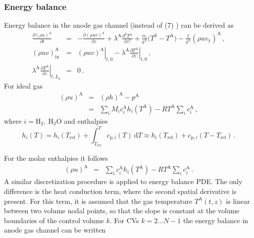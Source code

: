 \documentclass[pdftex,a4paper, 12pt]{article}
\begin{document}
\subsubsection*{Energy balance}
%
Energy balance in the anode gas channel (instead of (7) \cite{Mangold2010}) can be derived as
%
\begin{eqnarray}
	\frac{\partial (\rho u)^{\mathrm{A}}}{\partial t} &=&-\frac{\partial (\rho u v)^{\mathrm{A}}}{\partial z} + \lambda^{\mathrm{A}} 	\frac{\partial^2 T^{\mathrm{A}}}{\partial z^2} + \frac{\alpha_1}{\delta^{\mathrm{A}}} \big( T^{\mathrm{S}} - T^{\mathrm{A}} \big) - \frac{1}{\delta^{\mathrm{A}}} (\rho u v_{\mathrm{y}})^{\mathrm{A}} \, , \label{eq:energy_balA} \\
	(\rho u v)_{\mathrm{in}}^{\mathrm{A}} &=& \left.(\rho u v)^{\mathrm{A}} \right|_{t,0} - \left.\lambda^{\mathrm{A}} \frac{\partial T^{\mathrm{A}}}{\partial z} \right|_{t,0} \, , \label{eq:energy_balA_bc1} \\
	\left.\lambda^{\mathrm{A}} \frac{\partial T^{\mathrm{A}}}{\partial z} \right|_{t,L_{\mathrm{z}}} &=& 0 \, . \label{eq:energy_balA_bc2}
\end{eqnarray}
%
For ideal gas
\begin{eqnarray}
	(\rho u)^{\mathrm{A}} &=& (\rho h)^{\mathrm{A}} - p^{\mathrm{A}} \,\label{eq:rho_u_ideal_gas} \nonumber \\ 
	  &=& \sum_{i} M_{i} c_{i}^{\mathrm{A}} h_{i}(T^{\mathrm{A}}) - R T^{\mathrm{A}} \sum_{i} c_{i}^{\mathrm{A}} \, ,
\end{eqnarray}
%
where $i = \mathrm{H_2}, ~\mathrm{H_2O}$ and enthalpies
%
\begin{equation}
	h_{i}(T) = h_{i}(T_{\mathrm{ref}}) + \int_{T_{\mathrm{ref}}}^{T} c_{\mathrm{p,i}}(T) ~\mathrm{d}T \approx h_{i}(T_{\mathrm{ref}}) + c_{\mathrm{p},i} (T - T_{\mathrm{ref}}) \, .
	\label{eq:enthalpy_gasA}
\end{equation}
%
%
\par
%
For the molar enthalpies it follows
%
\begin{eqnarray}
	(\rho u)^{\mathrm{A}} &=& \sum_{i} c_{i}^{\mathrm{A}} h_{i}(T^{\mathrm{A}}) - R T^{\mathrm{A}} \sum_{i} c_{i}^{\mathrm{A}} \, .
\end{eqnarray}
%
A similar discretization procedure is applied to energy balance PDE. The only difference is the heat conduction term, where the second spatial derivative is present. For this term, it is assumed that the gas temperature $T^{\mathrm{A}}(t,z)$ is linear between two volume nodal points, so that the slope is constant at the volume boundaries of the control volume $k$. For CVs $k=2 \dots N-1$ the energy balance in anode gas channel can be written
\end{document}
